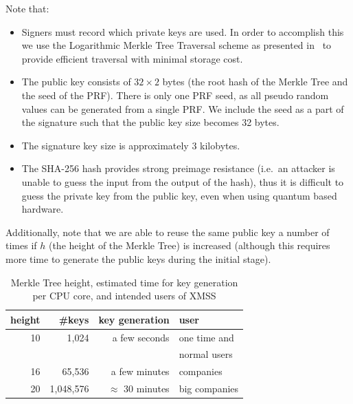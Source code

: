 \documentclass[a4paper,10pt,twocolumn]{article}
\begin{document}
	\vspace{2.5mm}
	
	Note that:
	\vspace{-0.5\baselineskip}
	\begin{itemize}
		\setlength\itemsep{0em}
		\item Signers must record which private keys are used. In order to accomplish this we use the Logarithmic Merkle Tree Traversal 
		scheme as presented in~\cite{traverse} to provide efficient traversal with minimal storage cost. \item The public key consists of 
		\(32 \times 2 \) bytes (the root hash of the Merkle Tree and the seed of the PRF). There is only one PRF seed, as all pseudo random 
		values can be generated from a single PRF\@. We include the seed as a part of the signature such that the public key size becomes 
		32 bytes. \item  The signature key size is approximately 3 kilobytes. \item The SHA-256 hash provides strong preimage resistance 
		(i.e.\ an attacker is unable to guess the input from the output of the hash), thus it is difficult to guess the private key from the public key, even when using quantum based hardware.
	\end{itemize}
			
	Additionally, note that we are able to reuse the same public key a number of times if \(h\) (the height of the Merkle Tree) is increased (although this requires more time to generate the public keys during the initial stage).
	
	\vspace{-2.5mm}
	
	\begin{table}[ht]
		\caption{Merkle Tree height, estimated time for key generation per CPU core, and intended users of XMSS}
		\label{tbl:height}
		\begin{tabular}{rrrl} 
			\toprule
			height  & \#keys & key generation & user \\ 
			\midrule
				  10 & 1,024 &  a few seconds & one time and\\
				  & & & normal users \\
				  16 & 65,536 & a few minutes & companies\\
				  20 & 1,048,576 & \( \approx \) 30 minutes &  big companies\\ 
				  \bottomrule
				\end{tabular}
	  \end{table}
	
\end{document}
